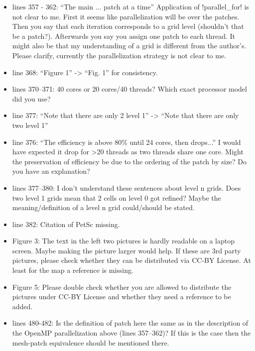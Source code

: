 \documentclass{letter}
\begin{document}
\begin{letter}
\begin{itemize}
    \item lines 357 - 362:  ``The main ... patch at a time'' Application of
    \verbatim!parallel_for! is not clear to me. First it seems like
    parallelization will be over the patches. Then you say that each iteration
    corresponds to a grid level (shouldn't that be a patch?). Afterwards you say
    you assign one patch to each thread. It might also be that my understanding
    of a grid is different from the author's. Please clarify, currently the
    parallelization strategy is not clear to me.

    \item line 368: ``Figure 1'' -> ``Fig. 1'' for consistency.

    \item lines 370--371: 40 cores or 20 cores/40 threads? Which exact processor
    model did you use?

    \item line 377: ``Note that there are only 2 level 1'' -> ``Note that there
    are only two level 1''

    \item line 376: ``The efficiency is above 80\% until 24 cores, then drops...'' 
    I would have expected it drop for >20 threads as two threads share one core.
    Might the preservation of efficiency be due to the ordering of the patch by
    size? Do you have an explanation?

    \item lines 377--380:  I don't understand these sentences about level n grids.
    Does two level 1 grids mean that 2 cells on level 0 got refined? Maybe the
    meaning/definition of a level n grid could/should be stated.

    \item line 382: Citation of PetSc missing.

    \item Figure 3:  The text in the left two pictures is hardly readable on a
    laptop screen. Maybe making the picture larger would help. If these are 3rd
    party pictures, please check whether they can be distributed via CC-BY
    License. At least for the map a reference is missing.

    \item Figure 5:  Please double check whether you are allowed to distribute
    the pictures under CC-BY License and whether they need a reference to be
    added.

    \item lines 480-482: Is the definition of patch here the same as in the
    description of the OpenMP parallelization above (lines 357--362)? If this is
    the case then the mesh-patch equivalence should be mentioned there.


\end{itemize}
\end{letter}
\end{document}
